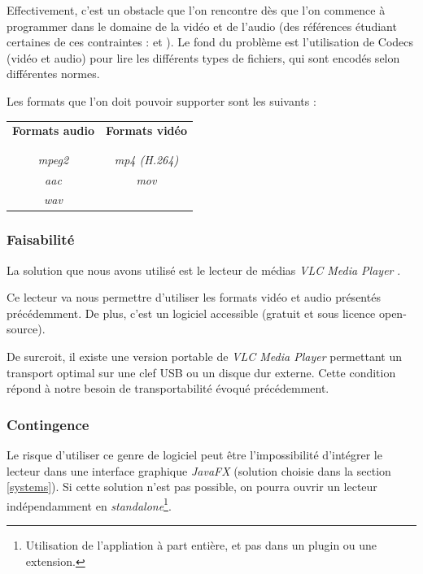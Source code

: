 Effectivement, c’est un obstacle que l’on rencontre dès que l’on commence à programmer dans le domaine de la vidéo et de l’audio (des références étudiant certaines de ces contraintes : \cite{ghanbari1999video} et \cite{he2013introduction}).
Le fond du problème est l’utilisation de Codecs (vidéo et audio) pour lire les différents types de fichiers, qui sont encodés selon différentes normes.

Les formats que l’on doit pouvoir supporter sont les suivants :\\

\begin{center}
\begin{tabular}{c|c}
\textbf{Formats audio} & \textbf{Formats vidéo} \\
\\
\hline
\\
\textit{mpeg2} & \textit{mp4 (H.264)}\\
\textit{aac} & \textit{mov}\\
\textit{wav} & ~
\end{tabular}
\end{center}
\vspace{0.6cm}

\subsubsection{Faisabilité}

La solution que nous avons utilisé est le lecteur de médias \textit{VLC Media Player} \cite{solutions2006vlc}.

Ce lecteur va nous permettre d'utiliser les formats vidéo et audio présentés précédemment. De plus, c'est un logiciel accessible (gratuit et sous licence open-source).

De surcroit, il existe une version portable de \textit{VLC Media Player} permettant un transport optimal sur une clef USB ou un disque dur externe. Cette condition répond à notre besoin de transportabilité évoqué précédemment.

\subsubsection{Contingence}

Le risque d’utiliser ce genre de logiciel peut être l'impossibilité d'intégrer le lecteur dans une interface graphique \textit{JavaFX} (solution choisie dans la section \ref{systems}). Si cette solution n’est pas possible, on pourra ouvrir un lecteur indépendamment en \textit{standalone}\footnote{Utilisation de l'appliation à part entière, et pas dans un plugin ou une extension.}.

